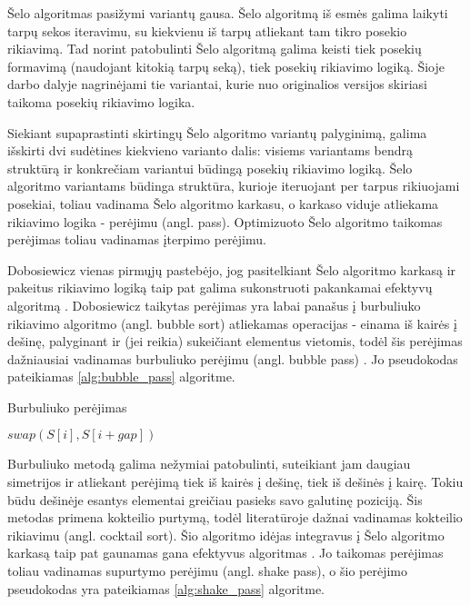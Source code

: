 \documentclass{VUMIFInfBakalaurinis}
\begin{document}
Šelo algoritmas pasižymi variantų gausa.
Šelo algoritmą iš esmės galima laikyti tarpų sekos iteravimu, su kiekvienu iš tarpų atliekant tam tikro posekio rikiavimą.
Tad norint patobulinti Šelo algoritmą galima keisti tiek posekių formavimą (naudojant kitokią tarpų seką), tiek posekių rikiavimo logiką.
Šioje darbo dalyje nagrinėjami tie variantai, kurie nuo originalios versijos skiriasi taikoma posekių rikiavimo logika.

Siekiant supaprastinti skirtingų Šelo algoritmo variantų palyginimą, galima išskirti dvi sudėtines kiekvieno varianto dalis:
visiems variantams bendrą struktūrą ir konkrečiam variantui būdingą posekių rikiavimo logiką.
Šelo algoritmo variantams būdinga struktūra, kurioje iteruojant per tarpus rikiuojami posekiai, toliau vadinama Šelo algoritmo karkasu,
o karkaso viduje atliekama rikiavimo logika - perėjimu (angl. pass).
Optimizuoto Šelo algoritmo taikomas perėjimas toliau vadinamas įterpimo perėjimu.

Dobosiewicz vienas pirmųjų pastebėjo, jog pasitelkiant
Šelo algoritmo karkasą ir pakeitus rikiavimo logiką taip pat galima sukonstruoti pakankamai efektyvų algoritmą \cite{dobosiewicz1980efficient}.
Dobosiewicz taikytas perėjimas yra labai panašus į burbuliuko rikiavimo algoritmo (angl. bubble sort) atliekamas operacijas -
einama iš kairės į dešinę, palyginant ir (jei reikia) sukeičiant elementus vietomis, todėl
šis perėjimas dažniausiai vadinamas burbuliuko perėjimu (angl. bubble pass) \cite{sedgewick1996analysis}.
Jo pseudokodas pateikiamas \ref{alg:bubble_pass} algoritme.

\begin{algorithm}[H]
  \caption{Burbuliuko perėjimas}\label{alg:bubble_pass}
  \begin{algorithmic}[1]
        \State $swap(S[i], S[i+gap])$
      \EndIf
    \EndFor
  \end{algorithmic}
\end{algorithm}

Burbuliuko metodą galima nežymiai patobulinti, suteikiant jam daugiau simetrijos ir atliekant perėjimą
tiek iš kairės į dešinę, tiek iš dešinės į kairę.
Tokiu būdu dešinėje esantys elementai greičiau pasieks savo galutinę poziciją.
Šis metodas primena kokteilio purtymą, todėl literatūroje dažnai vadinamas kokteilio rikiavimu (angl. cocktail sort).
Šio algoritmo idėjas integravus į Šelo algoritmo karkasą taip pat gaunamas gana efektyvus algoritmas \cite{incerpi1986practical}.
Jo taikomas perėjimas toliau vadinamas supurtymo perėjimu (angl. shake pass), o šio perėjimo pseudokodas yra pateikiamas \ref{alg:shake_pass} algoritme.
\end{document}
